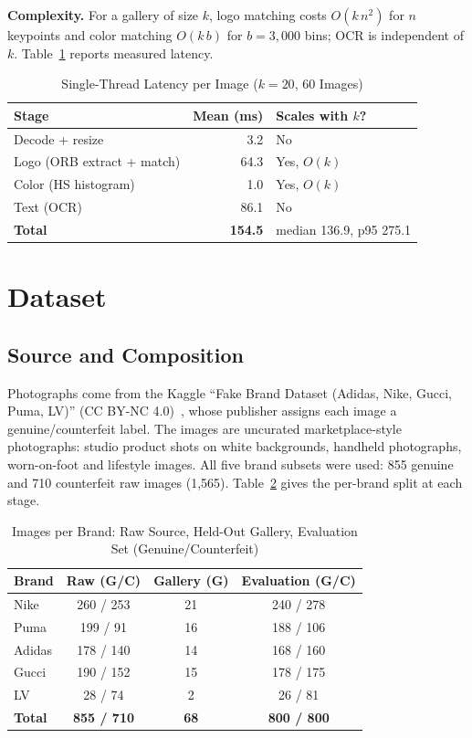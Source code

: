 \documentclass[conference]{IEEEtran}
\begin{document}
\textbf{Complexity.} For a gallery of size $k$, logo matching costs
$O(k\, n^2)$ for $n$ keypoints and color matching $O(k\, b)$ for
$b{=}3{,}000$ bins; OCR is independent of $k$. Table~\ref{tab:timing}
reports measured latency.

\begin{table}[t]
\caption{Single-Thread Latency per Image ($k{=}20$, 60 Images)}
\label{tab:timing}
\centering
\begin{tabular}{lrl}
\toprule
Stage & Mean (ms) & Scales with $k$? \\
\midrule
Decode + resize     & 3.2 & No \\
Logo (ORB extract + match) & 64.3 & Yes, $O(k)$ \\
Color (HS histogram)   & 1.0 & Yes, $O(k)$ \\
Text (OCR)          & 86.1 & No \\
\midrule
\textbf{Total} & \textbf{154.5} & median 136.9, p95 275.1 \\
\bottomrule
\end{tabular}
\end{table}

\section{Dataset}
\label{sec:dataset}

\subsection{Source and Composition}

Photographs come from the Kaggle ``Fake Brand Dataset (Adidas, Nike,
Gucci, Puma, LV)'' (CC BY-NC 4.0)~\cite{kaggledata}, whose publisher
assigns each image a genuine/counterfeit label. The images are uncurated
marketplace-style photographs: studio product shots on white backgrounds,
handheld photographs, worn-on-foot and lifestyle images. All five brand
subsets were used: 855 genuine and 710 counterfeit raw images (1{,}565).
Table~\ref{tab:dataset-brand} gives the per-brand split at each stage.

\begin{table}[t]
\caption{Images per Brand: Raw Source, Held-Out Gallery, Evaluation Set (Genuine/Counterfeit)}
\label{tab:dataset-brand}
\centering
\begin{tabular}{lccc}
\toprule
Brand & Raw (G/C) & Gallery (G) & Evaluation (G/C) \\
\midrule
Nike   & 260 / 253 & 21 & 240 / 278 \\
Puma   & 199 / 91  & 16 & 188 / 106 \\
Adidas & 178 / 140 & 14 & 168 / 160 \\
Gucci  & 190 / 152 & 15 & 178 / 175 \\
LV     & 28 / 74   & 2  & 26 / 81 \\
\midrule
\textbf{Total} & \textbf{855 / 710} & \textbf{68} & \textbf{800 / 800} \\
\bottomrule
\end{tabular}
\end{table}
\end{document}
